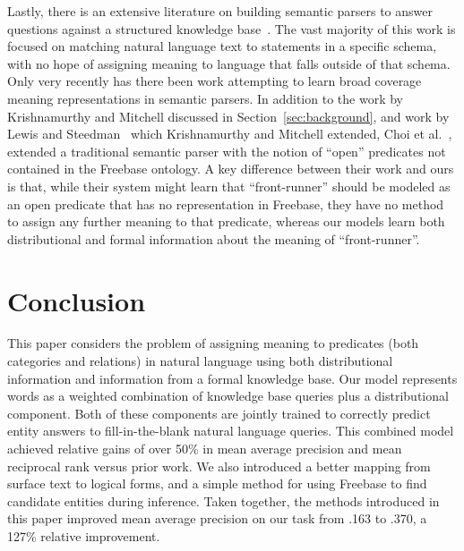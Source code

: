 \documentclass[11pt]{article}
\newcommand{\secref}[1]{Section~\ref{sec:#1}}
\begin{document}
Lastly, there is an extensive literature on building semantic parsers
to answer questions against a structured knowledge
base~\cite{zettlemoyer-2005-ccg,berant-2013-semantic-parsing-qa,%
kwiatkowski-2013-ontology-matching,krishnamurthy-2012-semantic-parsing,%
li-2015-semantic-parsing-scfg}.  The vast majority of this work is
focused on matching natural language text to statements in a specific
schema, with no hope of assigning meaning to language that falls
outside of that schema.  Only very recently has there been work
attempting to learn broad coverage meaning representations in semantic
parsers.  In addition to the work by Krishnamurthy and Mitchell
discussed in \secref{background}, and work by Lewis and
Steedman~
which Krishnamurthy and Mitchell extended, Choi et
al.~,
extended a traditional semantic parser with the notion of ``open''
predicates not contained in the Freebase ontology.  A key difference
between their work and ours is that, while their system might learn
that ``front-runner'' should be modeled as an open predicate that has
no representation in Freebase, they have no method to assign any
further meaning to that predicate, whereas our models learn both
distributional and formal information about the meaning of
``front-runner''.

\section{Conclusion}
\label{sec:conclusion}

This paper considers the problem of assigning meaning to predicates
(both categories and relations) in natural language using both
distributional information and information from a formal knowledge
base. Our model represents words as a weighted combination of
knowledge base queries plus a distributional component. Both of these
components are jointly trained to correctly predict entity answers to
fill-in-the-blank natural language queries. This combined model
achieved relative gains of over 50\% in mean average precision and
mean reciprocal rank versus prior work.  We also introduced a better
mapping from surface text to logical forms, and a simple method for
using Freebase to find candidate entities during inference.  Taken
together, the methods introduced in this paper improved mean average
precision on our task from .163 to .370, a 127\% relative improvement.
\end{document}
